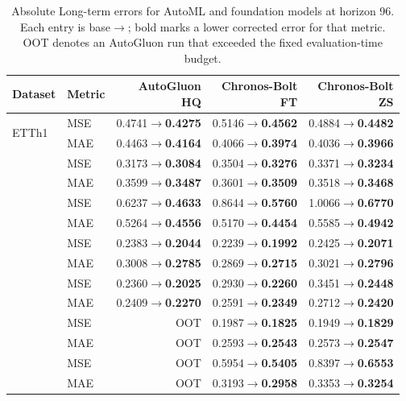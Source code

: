 \begin{table}[t]
\centering
\small
\setlength{\tabcolsep}{5pt}
\caption{Absolute Long-term errors for AutoML and foundation models at horizon 96. Each entry is base$\rightarrow$\method{}; bold marks a lower corrected error for that metric. OOT denotes an AutoGluon run that exceeded the fixed evaluation-time budget.}
\label{tab:strong-long-term-absolute-external}
\begin{tabular}{llrrr}
\toprule
Dataset & Metric & \shortstack{AutoGluon\\HQ} & \shortstack{Chronos-Bolt\\FT} & \shortstack{Chronos-Bolt\\ZS}\\
\midrule
\multirow{2}{*}{ETTh1} & MSE & 0.4741$\rightarrow$\textbf{0.4275} & 0.5146$\rightarrow$\textbf{0.4562} & 0.4884$\rightarrow$\textbf{0.4482}\\
 & MAE & 0.4463$\rightarrow$\textbf{0.4164} & 0.4066$\rightarrow$\textbf{0.3974} & 0.4036$\rightarrow$\textbf{0.3966}\\
\addlinespace[1pt]
\multirow{2}{*}{ETTh2} & MSE & 0.3173$\rightarrow$\textbf{0.3084} & 0.3504$\rightarrow$\textbf{0.3276} & 0.3371$\rightarrow$\textbf{0.3234}\\
 & MAE & 0.3599$\rightarrow$\textbf{0.3487} & 0.3601$\rightarrow$\textbf{0.3509} & 0.3518$\rightarrow$\textbf{0.3468}\\
\addlinespace[1pt]
\multirow{2}{*}{ETTm1} & MSE & 0.6237$\rightarrow$\textbf{0.4633} & 0.8644$\rightarrow$\textbf{0.5760} & 1.0066$\rightarrow$\textbf{0.6770}\\
 & MAE & 0.5264$\rightarrow$\textbf{0.4556} & 0.5170$\rightarrow$\textbf{0.4454} & 0.5585$\rightarrow$\textbf{0.4942}\\
\addlinespace[1pt]
\multirow{2}{*}{ETTm2} & MSE & 0.2383$\rightarrow$\textbf{0.2044} & 0.2239$\rightarrow$\textbf{0.1992} & 0.2425$\rightarrow$\textbf{0.2071}\\
 & MAE & 0.3008$\rightarrow$\textbf{0.2785} & 0.2869$\rightarrow$\textbf{0.2715} & 0.3021$\rightarrow$\textbf{0.2796}\\
\addlinespace[1pt]
\multirow{2}{*}{weather} & MSE & 0.2360$\rightarrow$\textbf{0.2025} & 0.2930$\rightarrow$\textbf{0.2260} & 0.3451$\rightarrow$\textbf{0.2448}\\
 & MAE & 0.2409$\rightarrow$\textbf{0.2270} & 0.2591$\rightarrow$\textbf{0.2349} & 0.2712$\rightarrow$\textbf{0.2420}\\
\addlinespace[1pt]
\multirow{2}{*}{electricity} & MSE & OOT & 0.1987$\rightarrow$\textbf{0.1825} & 0.1949$\rightarrow$\textbf{0.1829}\\
 & MAE & OOT & 0.2593$\rightarrow$\textbf{0.2543} & 0.2573$\rightarrow$\textbf{0.2547}\\
\addlinespace[1pt]
\multirow{2}{*}{traffic} & MSE & OOT & 0.5954$\rightarrow$\textbf{0.5405} & 0.8397$\rightarrow$\textbf{0.6553}\\
 & MAE & OOT & 0.3193$\rightarrow$\textbf{0.2958} & 0.3353$\rightarrow$\textbf{0.3254}\\
\bottomrule
\end{tabular}
\end{table}
